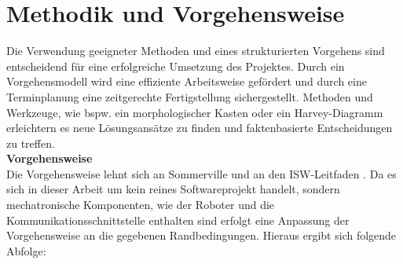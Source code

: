 \documentclass[ a4paper,
                oneside,
                toc=bibliography,
                toc=listof
                ]{scrbook}
\begin{document}
	\section{Methodik und Vorgehensweise}
	Die Verwendung geeigneter Methoden und eines strukturierten Vorgehens sind entscheidend für eine erfolgreiche Umsetzung des Projektes. Durch ein Vorgehensmodell wird eine effiziente Arbeitsweise gefördert und durch eine Terminplanung eine zeitgerechte Fertigstellung sichergestellt. Methoden und Werkzeuge, wie bspw. ein morphologischer Kasten oder ein Harvey-Diagramm erleichtern es neue Lösungsansätze zu finden und faktenbasierte Entscheidungen zu treffen. \cite{SoftwaretechnikBroy} \cite{ISWLeitfaden} \\
	\textbf{Vorgehensweise}\\
	Die Vorgehensweise lehnt sich an Sommerville \cite{Sommerville} und an den ISW-Leitfaden \cite{ISWLeitfaden}. Da es sich in dieser Arbeit um kein reines Softwareprojekt handelt, sondern mechatronische Komponenten, wie der Roboter und die Kommunikationsschnittstelle enthalten sind erfolgt eine Anpassung der Vorgehensweise an die gegebenen Randbedingungen. Hieraus ergibt sich folgende Abfolge:\\
\end{document}
